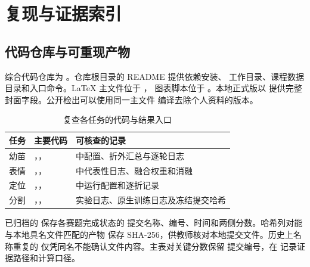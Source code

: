 \chapter{复现与证据索引}
\label{app:repro}

\section{代码仓库与可重现产物}
综合代码仓库为 \RepositoryLink。仓库根目录的 README 提供依赖安装、
工作目录、课程数据目录和入口命令。LaTeX 主文件位于 ，
图表脚本位于 。本地正式版以
 提供完整封面字段。公开检出可以使用同一主文件
编译去除个人资料的版本。

\begin{table}[H]
\centering\small
\caption{复查各任务的代码与结果入口}
\begin{tabularx}{\linewidth}{@{}P{21mm}YY@{}}
\toprule
任务 & 主要代码 & 可核查的记录 \\
\midrule
幼苗 & ，，
 &  中配置、折外汇总与逐轮日志 \\
表情 & ，，
 &  中代表性日志、融合权重和消融 \\
定位 & ，，
 &  中运行配置和逐折记录 \\
分割 & ，，
 & 实验日志、原生训练日志及冻结提交哈希 \\
\bottomrule
\end{tabularx}
\end{table}

已归档的  保存各赛题完成状态的
提交名称、编号、时间和两侧分数。哈希列对能与本地具名文件匹配的产物
保存 SHA-256，供教师核对本地提交文件。历史上名称重复的
 仅凭同名不能确认文件内容。主表对关键分数保留
提交编号，在  记录证据路径和计算口径。


